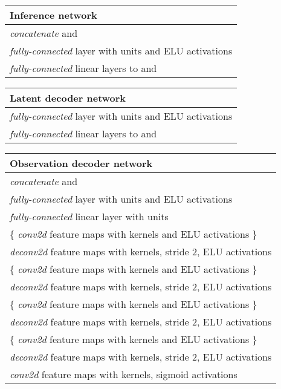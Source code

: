 \documentclass{article} \usepackage{iclr2017_conference,times}
\begin{document}
\begin{table}[H]

    \begin{tabular}{  l}
    \bf{Inference network}  \\ \hline
    \emph{concatenate}  and  \\
    \emph{fully-connected} layer with  units and ELU activations\\
    \emph{fully-connected} linear layers to  and 
\label{table:faces_inference_network}
    \end{tabular}
\end{table}
\begin{table}[H]

    \begin{tabular}{  l}
    \bf{Latent decoder network}   \\ \hline
    \emph{fully-connected} layer with  units and ELU activations\\
    \emph{fully-connected} linear layers to  and 
\label{table:faces_latent_decoder_network}
    \end{tabular}   
\end{table}

\begin{table}[H]

    \begin{tabular}{  l}
    \bf{Observation decoder network}   \\ \hline
    \emph{concatenate}  and  \\
    \emph{fully-connected} layer with  units and ELU activations \\
    \emph{fully-connected} linear layer with  units \\
     \{ \emph{conv2d}  feature maps with  kernels and ELU activations \} \\
    \emph{deconv2d}  feature maps with  kernels, stride 2, ELU activations \\
      \{ \emph{conv2d}  feature maps with  kernels and ELU activations \} \\
    \emph{deconv2d}  feature maps with  kernels, stride 2, ELU activations \\   
     \{ \emph{conv2d}  feature maps with  kernels and ELU activations \} \\
    \emph{deconv2d}  feature maps with  kernels, stride 2, ELU activations \\
      \{ \emph{conv2d}  feature maps with  kernels and ELU activations \} \\
    \emph{deconv2d}  feature maps with  kernels, stride 2, ELU activations \\  
    \emph{conv2d}  feature maps with  kernels, sigmoid activations
\label{table:faces_observation_decoder_network}
    \end{tabular}   
\end{table}
\end{document}
